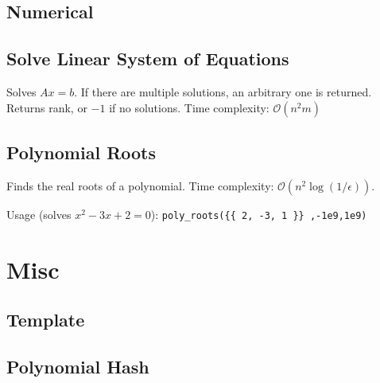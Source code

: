 \documentclass{article}
\begin{document}
\subsection*{Numerical}

\subsection*{Solve Linear System of Equations}
Solves $A x = b$. If there are multiple solutions, an arbitrary one is returned.
Returns rank, or $-1$ if no solutions. Time complexity: $\mathcal{O}(n^2 m)$



\subsection*{Polynomial Roots}

Finds the real roots of a polynomial. Time complexity: $\mathcal{O}(n^2 \log(1/\epsilon))$.

Usage (solves $x^2-3x+2 = 0$): \texttt{poly\_roots(\{\{ 2, -3, 1 \}\} ,-1e9,1e9)}




\section*{Misc}

\subsection*{Template}


\subsection*{Polynomial Hash}

\end{document}
